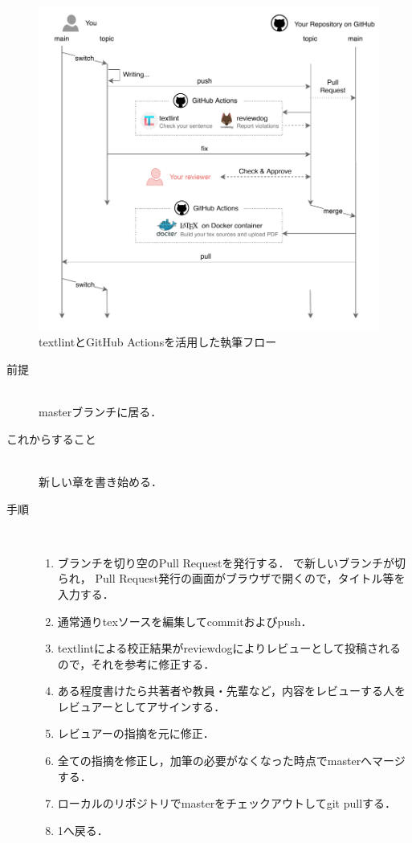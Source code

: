 \documentclass[main]{subfiles}
\begin{document}
\begin{figure}[h]
    \centering
    \includegraphics[keepaspectratio,scale=1.0]{../figures/textlint_workflow.pdf}
    \caption{textlintとGitHub Actionsを活用した執筆フロー}
    \label{fig:workflow}
\end{figure}

\begin{description}
    \item[前提]　\\
        masterブランチに居る．
    \item[これからすること]　\\
        新しい章を書き始める．
    \item[手順]　\\
        \begin{enumerate}
            \item ブランチを切り空のPull Requestを発行する．
                  で新しいブランチが切られ，
                  Pull Request発行の画面がブラウザで開くので，タイトル等を入力する．
            \item 通常通りtexソースを編集してcommitおよびpush．
            \item textlintによる校正結果がreviewdogによりレビューとして投稿されるので，それを参考に修正する．
            \item ある程度書けたら共著者や教員・先輩など，内容をレビューする人をレビュアーとしてアサインする．
            \item レビュアーの指摘を元に修正．
            \item 全ての指摘を修正し，加筆の必要がなくなった時点でmasterへマージする．
            \item ローカルのリポジトリでmasterをチェックアウトしてgit pullする．
            \item 1へ戻る．
        \end{enumerate}
\end{description}
\end{document}
